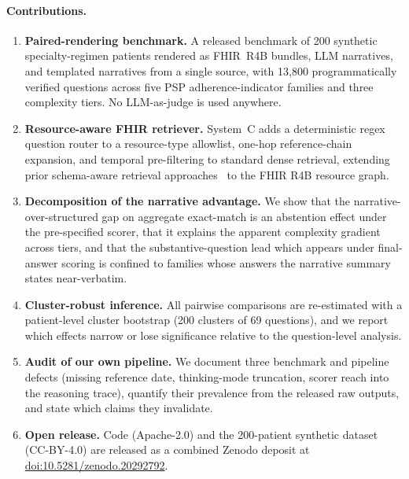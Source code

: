 \paragraph{Contributions.}
\begin{enumerate}
\item \textbf{Paired-rendering benchmark.}  A released benchmark of 200 synthetic
  specialty-regimen patients rendered as FHIR~R4B bundles, LLM narratives, and templated
  narratives from a single source, with 13,800 programmatically verified questions across
  five PSP adherence-indicator families and three complexity tiers.  No LLM-as-judge is
  used anywhere.

\item \textbf{Resource-aware FHIR retriever.}  System~C adds a deterministic regex
  question router to a resource-type allowlist, one-hop reference-chain expansion, and
  temporal pre-filtering to standard dense retrieval, extending prior schema-aware
  retrieval approaches~\citep{jiang2023structgpt} to the FHIR R4B resource graph.

\item \textbf{Decomposition of the narrative advantage.}  We show that the
  narrative-over-structured gap on aggregate exact-match is an abstention effect under
  the pre-specified scorer, that it explains the apparent complexity gradient across
  tiers, and that the substantive-question lead which appears under final-answer scoring
  is confined to families whose answers the narrative summary states near-verbatim.

\item \textbf{Cluster-robust inference.}  All pairwise comparisons are re-estimated with
  a patient-level cluster bootstrap (200 clusters of 69 questions), and we report which
  effects narrow or lose significance relative to the question-level analysis.

\item \textbf{Audit of our own pipeline.}  We document three benchmark and pipeline
  defects (missing reference date, thinking-mode truncation, scorer reach into the
  reasoning trace), quantify their prevalence from the released raw outputs, and state
  which claims they invalidate.

\item \textbf{Open release.}  Code (Apache-2.0) and the 200-patient synthetic
  dataset (CC-BY-4.0) are released as a combined Zenodo deposit at
  \href{https://doi.org/10.5281/zenodo.20292792}{doi:10.5281/zenodo.20292792}.
\end{enumerate}
